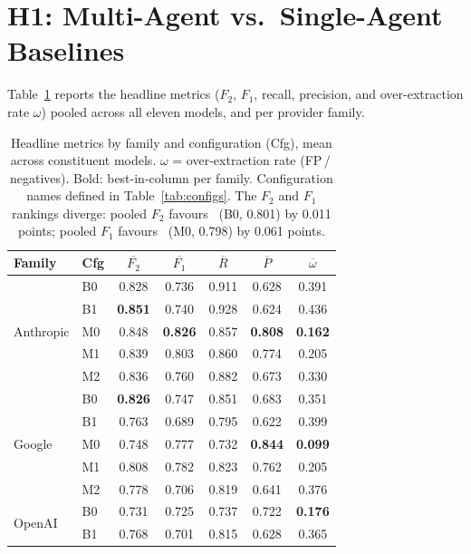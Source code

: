 \section{H1: Multi-Agent vs.\ Single-Agent Baselines}\label{sec:res:h1}

Table~\ref{tab:h1-headline} reports the headline metrics ($F_2$, $F_1$,
recall, precision, and over-extraction rate $\omega$) pooled across all
eleven models, and per provider family.

\begin{table}[htbp]
  \centering
  \small
  \caption{Headline metrics by family and configuration (Cfg), mean across
  constituent models. $\omega$ = over-extraction rate (FP\,/\,negatives).
  Bold: best-in-column per family. Configuration names defined in
  Table~\ref{tab:configs}.
  The $F_2$ and $F_1$ rankings diverge: pooled $F_2$ favours \cfgZS\ (B0, 0.801)
  by 0.011 points; pooled $F_1$ favours \cfgCX\ (M0, 0.798) by 0.061 points.}
  \label{tab:h1-headline}
  \begin{tabular*}{\linewidth}{@{\extracolsep{\fill}}llccccc@{}}
    \toprule
    \textbf{Family} & \textbf{Cfg} & $\overline{F_2}$ & $\overline{F_1}$ &
    $\overline{R}$ & $\overline{P}$ & $\overline{\omega}$ \\
    \midrule
    \multirow{5}{*}{Anthropic}
      & B0 & 0.828 & 0.736 & 0.911 & 0.628 & 0.391 \\
      & B1 & \textbf{0.851} & 0.740 & 0.928 & 0.624 & 0.436 \\
      & M0 & 0.848 & \textbf{0.826} & 0.857 & \textbf{0.808} & \textbf{0.162} \\
      & M1 & 0.839 & 0.803 & 0.860 & 0.774 & 0.205 \\
      & M2 & 0.836 & 0.760 & 0.882 & 0.673 & 0.330 \\
    \midrule
    \multirow{5}{*}{Google}
      & B0 & \textbf{0.826} & 0.747 & 0.851 & 0.683 & 0.351 \\
      & B1 & 0.763 & 0.689 & 0.795 & 0.622 & 0.399 \\
      & M0 & 0.748 & 0.777 & 0.732 & \textbf{0.844} & \textbf{0.099} \\
      & M1 & 0.808 & 0.782 & 0.823 & 0.762 & 0.205 \\
      & M2 & 0.778 & 0.706 & 0.819 & 0.641 & 0.376 \\
    \midrule
    \multirow{5}{*}{OpenAI}
      & B0 & 0.731 & 0.725 & 0.737 & 0.722 & \textbf{0.176} \\
      & B1 & 0.768 & 0.701 & 0.815 & 0.628 & 0.365 \\

\end{tabular*}
\end{table}
